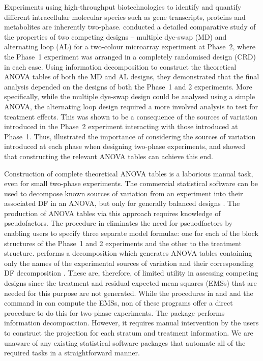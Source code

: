 \documentclass[article]{jss}
\begin{document}
Experiments using high-throughput biotechnologies to identify and quantify different intracellular molecular species such as gene transcripts, proteins and metabolites are inherently two-phase. \cite{Jarrett2008} conducted a detailed comparative study of the properties of two competing designs -- multiple dye-swap (MD) and alternating loop (AL) \citep{Churchill2002} for a two-colour microarray experiment at Phase~2, where the Phase~1 experiment was arranged in a completely randomised design (CRD) in each case. Using information decomposition to construct the theoretical ANOVA tables of both the MD and AL designs, they demonstrated that the final analysis depended on the designs of both the Phase~1 and 2 experiments. More specifically, while the multiple dye-swap design could be analysed using a simple ANOVA, the alternating loop design required a more involved analysis to test for treatment effects. This was shown to be a consequence of the sources of variation introduced in the Phase~2 experiment interacting with those introduced at Phase~1. Thus, \cite{Jarrett2008} illustrated the importance of considering the sources of variation introduced at each phase when designing two-phase experiments, and showed that constructing the relevant ANOVA tables can achieve this end.

Construction of complete theoretical ANOVA tables is a laborious manual task, even for small two-phase experiments. The commercial statistical software  can be used to decompose known sources of variation from an experiment into their associated DF in an ANOVA, but only for generally balanced designs \citep{Payne2003}. The production of ANOVA tables via this approach requires knowledge of pseudofactors. The  procedure in  eliminates the need for pseuodfactors by enabling users to specify three separate model formulae: one for each of the block structures of the Phase~1 and 2 experiments and the other to the treatment structure.  performs a decomposition which generates ANOVA tables containing only the names of the experimental sources of variation and their corresponding DF decomposition \citep{Brien2006a}. These are, therefore, of limited utility in assessing competing designs since the treatment and residual expected mean squares (EMSs) that are needed for this purpose are not generated. While the  procedures in  and  and the  command in  can compute the EMSs, non of these programs offer a direct procedure to do this for two-phase experiments. The   package \citep{Brien2011a} performs information decomposition. However, it requires manual intervention by the users to construct the projection for each stratum and treatment information. We are unaware of any existing statistical software packages that automate all of the required tasks in a straightforward manner.
\end{document}
